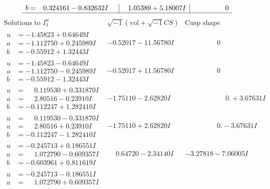 \documentclass[1p]{elsarticle_modified}
\theoremstyle{definition}
\newcommand{\I}{\sqrt{-1}}
\begin{document}
$$\begin{array}{c|c|c}
\begin{aligned}
b &= \phantom{-}0.324161 - 0.832632 I\end{aligned}
 & \phantom{-}1.05389 + 5.18007 I & \phantom{-0.000000 } 0\\
 \hline 
 \end{array}$$\newpage$$\begin{array}{c|c|c}  
\text{Solutions to }I^u_{1}& \I (\text{vol} + \sqrt{-1}CS) & \text{Cusp shape}\\
 \hline 
\begin{aligned}
u &= -1.45823 + 0.64649 I \\
a &= -1.112750 + 0.245989 I \\
b &= -0.55912 + 1.32443 I\end{aligned}
 & -0.52017 - 11.56780 I & \phantom{-0.000000 } 0 \\ \hline\begin{aligned}
u &= -1.45823 - 0.64649 I \\
a &= -1.112750 - 0.245989 I \\
b &= -0.55912 - 1.32443 I\end{aligned}
 & -0.52017 + 11.56780 I & \phantom{-0.000000 } 0 \\ \hline\begin{aligned}
u &= \phantom{-}0.119530 + 0.331870 I \\
a &= \phantom{-}2.80516 - 0.23910 I \\
b &= -0.112247 + 1.282410 I\end{aligned}
 & -1.75110 - 2.62820 I & \phantom{-0.000000 -}0. + 3.67631 I \\ \hline\begin{aligned}
u &= \phantom{-}0.119530 - 0.331870 I \\
a &= \phantom{-}2.80516 + 0.23910 I \\
b &= -0.112247 - 1.282410 I\end{aligned}
 & -1.75110 + 2.62820 I & \phantom{-0.000000 } 0. - 3.67631 I \\ \hline\begin{aligned}
u &= -0.245713 + 0.186551 I \\
a &= \phantom{-}1.072790 - 0.609357 I \\
b &= -0.603961 + 0.811619 I\end{aligned}
 & \phantom{-}0.64720 - 2.34140 I & -3.27818 - 7.06005 I \\ \hline\begin{aligned}
u &= -0.245713 - 0.186551 I \\
a &= \phantom{-}1.072790 + 0.609357 I \\

\end{aligned}
\end{array}$$
\end{document}
